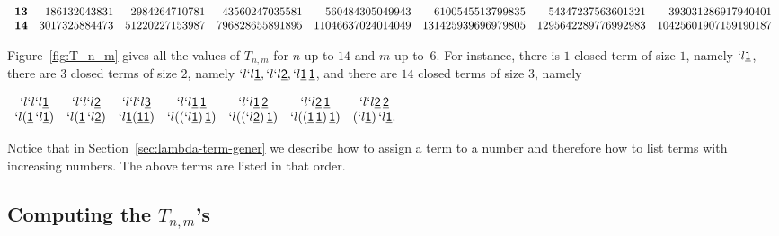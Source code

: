 \documentclass{jfp1}
\newcommand{\Var}[1]{\underline{\mathsf{#1}}}
\begin{document}
\begin{figure*}
\begin{tiny}
\begin{math}
\begin{array}[c]{ c r  r  r  r  r  r  r }
\mathbf{13} &186132043831 & 2984264710781 & 43560247035581 & 560484305049943 &
        6100545513799835 & 54347237563601321 & 393031286917940401
        \\
\mathbf{14} &3017325884473 & 51220227153987 & 796828655891895 & 11046637024014049 &
        131425939696979805 & 1295642289776992983 & 10425601907159190187\\
\end{array}
    \end{math}
  \end{tiny}
  \caption{Values of $T_{n,m}$ for $n$ and $m$ up to $14$ and $6$, respectively}
  \label{fig:T_n_m}
\end{figure*}

Figure~\ref{fig:T_n_m} gives all the values of $T_{n,m}$ for $n$ up to $14$ and $m$ up
to~$6$.  For instance, there is $1$ closed term of size $1$, namely $`l\Var{1}$, there are
$3$ closed terms of size $2$, namely $ `l `l \Var{1}, `l `l \Var{2}, `l \Var{1}\, \Var{1}$,
and there are $14$ closed terms of size $3$, namely



\begin{center}
  \begin{math}
    \begin{array}{ccccccc}
`l`l`l \Var{1} & `l`l`l \Var{2} & `l`l`l \Var{3} & `l`l \Var{1}\,\Var{1} & `l`l \Var{1}\,\Var{2}& 
      `l`l \Var{2}\,\Var{1} & `l`l \Var{2}\,\Var{2} \\ 
`l (\Var{1}\, `l \Var{1}) & `l (\Var{1}\, `l \Var{2}) & `l \Var{1} (\Var{1} \Var{1}) & `l ((`l\Var{1})\, \Var{1} ) & `l ((`l\Var{2})\, \Var{1} ) & `l((\Var{1}\,\Var{1}) \, \Var{1}) & (`l \Var{1})\, `l \Var{1}.
  \end{array}
  \end{math}
\end{center}

Notice that in Section~\ref{sec:lambda-term-gener} we describe how to assign a term 
to a number and therefore how to list terms with increasing numbers.  The above terms
are listed in that order.

\subsection{Computing the $T_{n,m}$'s}
\label{sec:actual}
\end{document}

